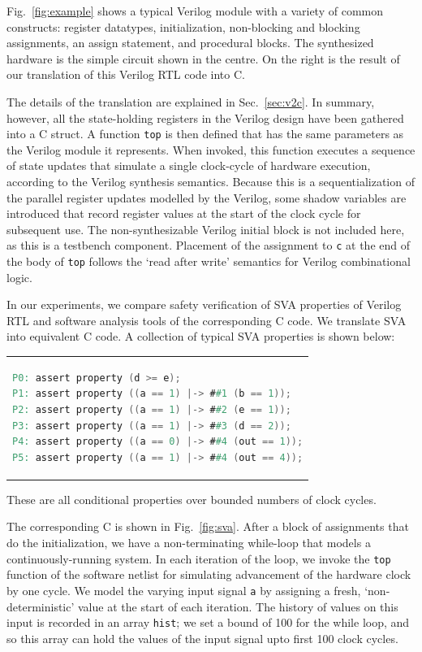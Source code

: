 Fig.~\ref{fig:example} shows a typical Verilog module with a variety of common constructs: register datatypes, initialization, non-blocking and blocking assignments, an assign statement, and procedural blocks.  The synthesized hardware is the simple circuit shown in the centre.  On the right is the result of our translation of this Verilog RTL code into C.

The details of the translation are explained in Sec.~\ref{sec:v2c}. In summary, however, all the state-holding registers in the Verilog design have been gathered into a C struct. A function \texttt{top} is then defined that has the same parameters as the Verilog module it represents. When invoked, this function executes a sequence of state updates that simulate a single clock-cycle of hardware execution, according to the Verilog synthesis semantics. Because this is a sequentialization of the parallel register updates modelled by the Verilog, some shadow variables are introduced that record register values at the start of the clock cycle for subsequent use.  The non-synthesizable Verilog initial block is not included here, as this is a testbench component.  Placement of the assignment to \texttt{c} at the end of the body of \texttt{top} follows the `read after write' semantics for Verilog combinational logic.

In our experiments, we compare safety verification of SVA properties of Verilog RTL and software analysis tools of the corresponding C code.  
We translate SVA into equivalent C code. A collection of typical SVA properties is shown below:

\begin{center}
\begin{tabular}[t]{@{}l@{}}
\begin{lstlisting}[mathescape=true,language=Verilog,basicstyle=\scriptsize\ttfamily]
P0: assert property (d >= e);
P1: assert property ((a == 1) |-> ##1 (b == 1));
P2: assert property ((a == 1) |-> ##2 (e == 1));
P3: assert property ((a == 1) |-> ##3 (d == 2));
P4: assert property ((a == 0) |-> ##4 (out == 1));
P5: assert property ((a == 1) |-> ##4 (out == 4));
\end{lstlisting}
\end{tabular}
\end{center}

\noindent These are all conditional properties over bounded numbers of clock cycles. 
 
The corresponding C is shown in Fig.~\ref{fig:sva}. After a block of assignments that do the initialization, we have a non-terminating while-loop that models a continuously-running system. In each iteration of the loop, we invoke the \texttt{top} function of the software netlist for simulating advancement of the hardware clock by one cycle.   We model the varying input signal \texttt{a} by assigning a fresh, `non-deterministic' value at the start of each iteration. The history of values on this input is recorded in an array \texttt{hist}; we set a bound of 100 for the while loop, and so this array can hold the values of the input signal upto first 100 clock cycles. 

